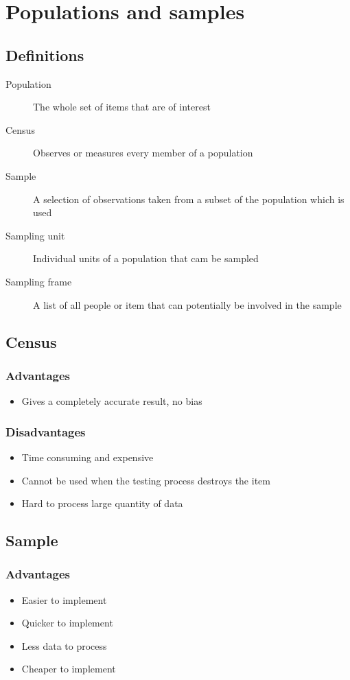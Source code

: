 \section{Populations and samples}
\subsection{Definitions}
\begin{description}
	\item[Population] The whole set of items that are of interest
	\item[Census] Observes or measures every member of a population
	\item[Sample] A selection of observations taken from a subset of the population which is used
	\item[Sampling unit] Individual units of a population that cam be sampled
	\item[Sampling frame] A list of all people or item that can potentially be involved in the sample
\end{description}

\subsection{Census}
\subsubsection{Advantages}
\begin{itemize}
	\item Gives a completely accurate result, no bias
\end{itemize}
\subsubsection{Disadvantages}
\begin{itemize}
	\item Time consuming and expensive
	\item Cannot be used when the testing process destroys the item
	\item Hard to process large quantity of data
\end{itemize}
\subsection{Sample}
\subsubsection{Advantages}
\begin{itemize}
	\item Easier to implement
	\item Quicker to implement
	\item Less data to process
	\item Cheaper to implement
\end{itemize}
